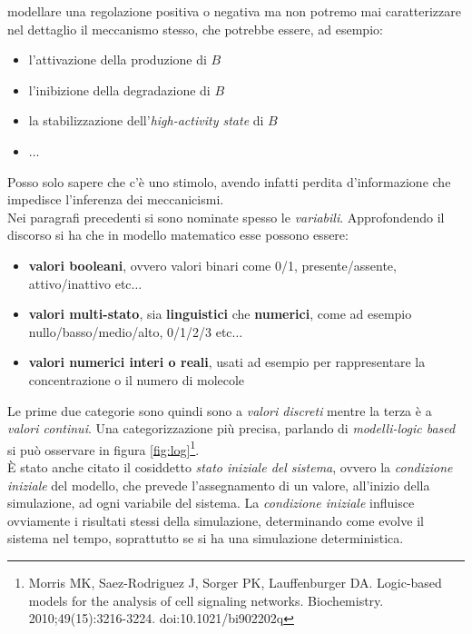 \documentclass[a4paper,12pt, oneside]{book}
\begin{document}
modellare una regolazione positiva o negativa ma non
potremo mai caratterizzare nel dettaglio il meccanismo stesso, che potrebbe
essere, ad esempio: 
\begin{itemize}
  \item l'attivazione della produzione di $B$
  \item l'inibizione della degradazione di $B$
  \item la stabilizzazione dell'\textit{high-activity state} di $B$
  \item $\ldots$
\end{itemize}
Posso solo sapere che c'è uno stimolo, avendo infatti perdita d'informazione che
impedisce l'inferenza dei meccanicismi. \\
Nei paragrafi precedenti si sono nominate spesso le
\textit{variabili}. Approfondendo il discorso si ha che in modello matematico
esse possono essere:
\begin{itemize}
  \item \textbf{valori booleani}, ovvero valori binari come 0/1,
  presente/assente, attivo/inattivo etc$\ldots$
  \item \textbf{valori multi-stato}, sia \textbf{linguistici} che
  \textbf{numerici}, come ad esempio nullo/basso/medio/alto, 0/1/2/3 etc$\ldots$
  \item \textbf{valori numerici interi o reali}, usati ad esempio per
  rappresentare la concentrazione o il numero di molecole
\end{itemize}
Le prime due categorie sono quindi sono a \textit{valori discreti} mentre la
terza è a \textit{valori continui}. Una categorizzazione più precisa, parlando
di \textit{modelli-logic based} si può osservare in figura
\ref{fig:log}\footnote{Morris MK, Saez-Rodriguez J, Sorger PK, Lauffenburger
  DA. Logic-based models for the analysis of cell signaling
  networks. Biochemistry. 2010;49(15):3216-3224. doi:10.1021/bi902202q}. \\ 
È stato anche citato il cosiddetto \textit{stato iniziale del sistema}, ovvero
la \textit{condizione iniziale} del modello, che prevede l'assegnamento di un
valore, all'inizio della simulazione, ad ogni variabile del sistema. La
\textit{condizione iniziale} influisce ovviamente i risultati stessi della
simulazione, determinando come evolve il sistema nel tempo, soprattutto se si ha
una simulazione deterministica.
\end{document}
